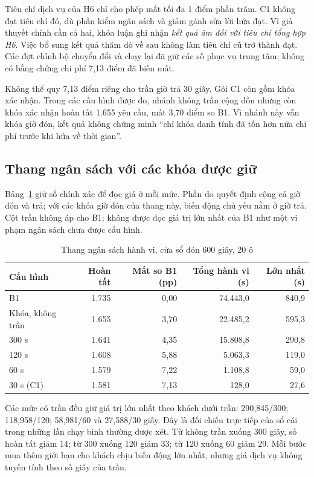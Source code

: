Tiêu chí dịch vụ của H6 chỉ cho phép mất tối đa 1 điểm phần trăm. C1 không đạt tiêu chí
đó, dù phần kiểm ngân sách và giảm gánh sửa lời hứa đạt. Vì giả thuyết chính cần cả hai,
khóa luận ghi nhận \emph{kết quả âm đối với tiêu chí tổng hợp H6}. Việc bổ sung kết quả
thăm dò về sau không làm tiêu chí cũ trở thành đạt. Các đợt chỉnh bộ chuyển đổi và chạy lại đã
giữ các số phục vụ trung tâm; không có bằng chứng chi phí 7,13 điểm đã biến mất.

Không thể quy 7,13 điểm riêng cho trần giờ trả 30 giây. Gói C1 còn gồm khóa xác nhận.
Trong các cấu hình được đo, nhánh không trần cộng dồn nhưng còn khóa xác nhận hoàn tất
1.655 yêu cầu, mất 3,70 điểm so B1. Vì nhánh này vẫn khóa giờ đón, kết quả không chứng
minh ``chỉ khóa danh tính đã tốn hơn nửa chi phí trước khi hứa về thời gian''.

\subsection{Thang ngân sách với các khóa được giữ}

Bảng~\ref{bang:thang1} giữ số chính xác để đọc giá ở mỗi mức. Phần do quyết định cộng
cả giờ đón và trả; với các khóa giờ đón của thang này, biến động chủ yếu nằm ở giờ trả.
Cột trần không áp cho B1; không được đọc giá trị lớn nhất của B1 như một vi phạm ngân
sách chưa được cấu hình.

\begin{table}[htbp]
\centering
\caption{Thang ngân sách hành vi, cửa sổ đón 600 giây, 20 ô}
\label{bang:thang1}
\small
\begin{tabular}{@{}lrrrr@{}}
\toprule
\textbf{Cấu hình} & \textbf{Hoàn tất} & \textbf{Mất so B1 (pp)} & \textbf{Tổng hành vi (s)} & \textbf{Lớn nhất (s)}\\
\midrule
B1 & 1.735 & 0,00 & 74.443,0 & 840,9\\
Khóa, không trần & 1.655 & 3,70 & 22.485,2 & 595,3\\
300 s & 1.641 & 4,35 & 15.808,8 & 290,8\\
120 s & 1.608 & 5,88 & 5.063,3 & 119,0\\
60 s & 1.579 & 7,22 & 1.108,8 & 59,0\\
30 s (C1) & 1.581 & 7,13 & 128,0 & 27,6\\
\bottomrule
\end{tabular}
\end{table}

Các mức có trần đều giữ giá trị lớn nhất theo khách dưới trần: 290,845/300;
118,958/120; 58,981/60 và 27,588/30 giây. Đây là đối chiếu trực tiếp của sổ cái trong
những lần chạy bình thường được xét. Từ không trần xuống 300 giây, số hoàn tất giảm
14; từ 300 xuống 120 giảm 33; từ 120 xuống 60 giảm 29. Mỗi bước mua thêm giới hạn cho
khách chịu biến động lớn nhất, nhưng giá dịch vụ không tuyến tính theo số giây của trần.

